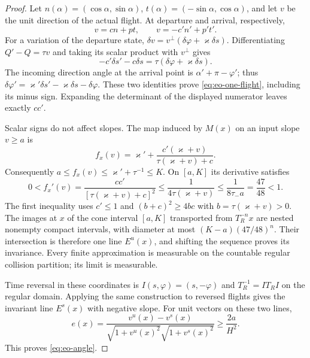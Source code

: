 \begin{proof}
Let $n(\alpha)=(\cos\alpha,\sin\alpha)$,
$t(\alpha)=(-\sin\alpha,\cos\alpha)$, and let $v$ be the
unit direction of the actual flight.  At departure and arrival,
respectively,
\[
                  v=cn+pt,\qquad v=-c'n'+p't'.
\]
For a variation of the departure state,
$\delta v=v^\perp(\delta\varphi+\varkappa\delta s)$.
Differentiating $Q'-Q=\tau v$ and taking its scalar product with
$v^\perp$ gives
\[
     -c'\delta s'-c\delta s
                   =\tau(\delta\varphi+\varkappa\delta s).
\]
The incoming direction angle at the arrival point is
$\alpha'+\pi-\varphi'$; thus
$\delta\varphi'=\varkappa'\delta s'
                         -\varkappa\delta s-\delta\varphi$.
These two identities prove \eqref{eq:eo-one-flight}, including
its minus sign.  Expanding the determinant of the displayed
numerator leaves exactly $cc'$.

Scalar signs do not affect slopes.  The map induced by $M(x)$ on
an input slope $v\ge a$ is
\begin{equation}\label{eq:eo-slope-map}
 f_x(v)=\varkappa'
     +\frac{c'(\varkappa+v)}{\tau(\varkappa+v)+c}.
\end{equation}
Consequently $a\le f_x(v)\le\varkappa'+\tau^{-1}\le K$.
On $[a,K]$ its derivative satisfies
\begin{equation}\label{eq:eo-slope-contraction}
 0<f_x'(v)=
     \frac{cc'}{[\tau(\varkappa+v)+c]^2}
 \le\frac1{4\tau(\varkappa+v)}
 \le\frac1{8\tau_-a}=\frac{47}{48}<1.
\end{equation}
The first inequality uses $c'\le1$ and
$(b+c)^2\ge4bc$ with $b=\tau(\varkappa+v)>0$.
The images at $x$ of the cone interval $[a,K]$ transported from
$T_R^{-n}x$ are nested nonempty compact intervals, with diameter
at most $(K-a)(47/48)^n$.  Their intersection is therefore one
line $E^u(x)$, and shifting the sequence proves its invariance.
Every finite approximation is measurable on the countable regular
collision partition; its limit is measurable.

Time reversal in these coordinates is
$I(s,\varphi)=(s,-\varphi)$ and $T_R^{-1}=IT_RI$ on the
regular domain.  Applying the same construction to reversed
flights gives the invariant line $E^s(x)$ with negative slope.
For unit vectors on these two lines,
\[
 e(x)=\frac{v^u(x)-v^s(x)}
          {\sqrt{1+v^u(x)^2}\sqrt{1+v^s(x)^2}}
                  \ge\frac{2a}{H^2}.
\]
This proves \eqref{eq:eo-angle}.


\end{proof}
